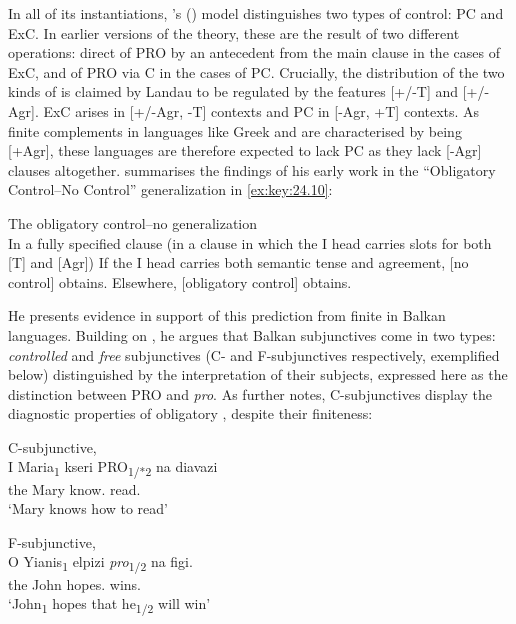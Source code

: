 \documentclass[output=paper]{langsci/langscibook}
\begin{document}
In all of its instantiations, \citeauthor{Landau2000}'s
(\citeyear{Landau2000,Landau2004,Landau2015}) model distinguishes two types of
control: \gls{PC} and
\gls{ExC}. In earlier versions of the theory,
these are the result of two different operations: direct  of PRO by an
antecedent from the main clause in the cases of \gls{ExC}, and  of PRO via C in the cases of PC. Crucially, the
distribution of the two kinds of  is claimed by Landau to be regulated
by the features [+/-T] and [+/-Agr]. \gls{ExC}
arises in [+/-Agr, -T] contexts and \gls{PC} in
[-Agr, +T] contexts. As finite complements in languages like Greek and 
are characterised by being [+Agr], these languages are therefore expected to
lack \gls{PC} as they lack [-Agr] clauses
altogether.  \citet[7]{Landau2015} summarises the findings of his early work in
the “Obligatory Control--No Control” generalization in \eqref{ex:key:24.10}:

\ea\label{ex:key:24.10} The obligatory control--no  generalization\\
In a fully specified clause (in a clause in which the I head carries slots for both [T] and [Agr])
	\ea If the I head carries both semantic tense and agreement, [no control] obtains.
	\ex Elsewhere, [obligatory control] obtains.
	\z
\z

He presents evidence in support of this prediction from finite  in
Balkan languages. Building on \citet{Varlokosta1994}, he argues that Balkan
subjunctives come in two types: \emph{controlled} and \emph{free} subjunctives
(C- and F-subjunctives respectively, exemplified below) distinguished by the
interpretation of their subjects, expressed here as the distinction between PRO
and \emph{pro}. As \citet[827]{Landau2004} further notes, C-subjunctives
display the diagnostic properties of obligatory , despite their
finiteness:

\ea\label{ex:key:24.11} C-subjunctive, \\
    \sn
    \gll I Maria\textsubscript{1}   kseri PRO\textsubscript{1/*2} na   diavazi \\
		the Mary   know.\Tsg{} {}  \Ptcl{}   read.\Tsg{}\\
	\glt ‘Mary knows how to read’
\z

\ea\label{ex:key:24.12} F-subjunctive,  \parencite[(21)]{Varlokosta1994}\\
	\gll O Yianis\textsubscript{1}   elpizi  \emph{pro}\textsubscript{1/2} na   figi. \\
		the John   hopes.\Tsg{} {}    \Ptcl{}   wins.\Tsg{} \\
	\glt ‘John\textsubscript{1} hopes that he\textsubscript{1/2} will win’
\z
\end{document}
